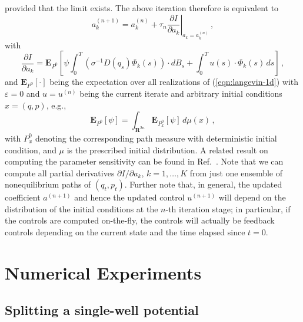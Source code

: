 \documentclass[]{tMPH2e}
\newcommand{\recheck}[1]{{\color{red} #1}}
\newcommand{\R}{{\mathbf R}}
\newcommand{\eps}{\varepsilon}
\newcommand{\bE}{{\mathbf E}}
\begin{document}
provided that the limit exists. The above iteration therefore is equivalent to
\begin{equation}\label{gd}
a_{k}^{(n+1)} = a_{k}^{(n)} + \tau_{n}\left.\frac{\partial I}{\partial a_{k}}\right|_{a_{k}=a_{k}^{(n)}}\,,
\end{equation}
with
\begin{equation}\label{dida}
\frac{\partial I}{\partial a_{k}} = \bE_{P^0}\left[\psi\int_{0}^{T}(\sigma^{-1}D(q_{s})\Phi_{k}(s))\cdot dB_{s} + \int_{0}^{T}u(s)\cdot\Phi_{k}(s)\,ds \right] \,,
\end{equation}
and $\bE_{P^0}[\cdot]$ being the expectation over all realizations of (\ref{eqn:langevin-1d}) with $\eps=0$ and $u=u^{(n)}$ being the current iterate and arbitrary initial conditions $x=(q,p)$, e.g., 
\[
\bE_{P^{0}}[\psi] = \int_{\R^{2n}}\bE_{P^{0}_{x}}[\psi]\,d\mu(x) \,,
\]
with $P_{x}^{0}$ denoting the corresponding path measure with deterministic initial condition, and $\mu$ is the prescribed initial distribution.
\recheck{A related result on computing the parameter sensitivity can be found
  in Ref.~\cite{warren2012malliavin}.}
Note that we can compute all partial derivatives $\partial I/\partial a_k$, $k=1,\ldots,K$ from just one ensemble of nonequilibrium paths of $(q_{t},p_{t})$. Further note that, in general, the updated coefficient $a^{(n+1)}$ and hence the updated control $u^{(n+1)}$ will depend on the distribution of the initial conditions at the $n$-th iteration stage; in particular, if the controls are computed on-the-fly, the controls will actually be feedback controls depending on the current state and the time elapsed since $t=0$.    





\section{Numerical Experiments}

\subsection{Splitting a single-well potential}
\end{document}
